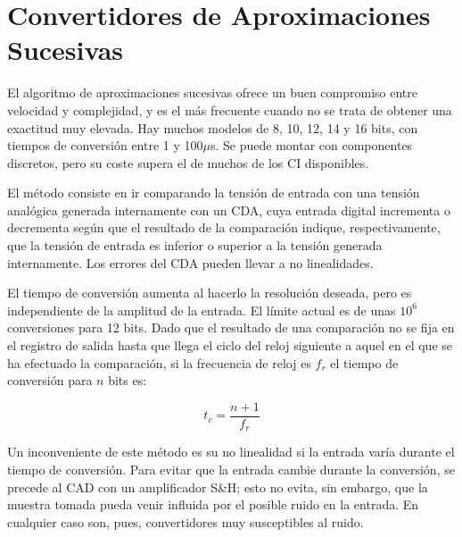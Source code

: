 \chapter{Convertidores de Aproximaciones Sucesivas}

El algoritmo de aproximaciones sucesivas ofrece un buen compromiso entre velocidad y complejidad, y es el más frecuente cuando no se trata de obtener una exactitud muy elevada. Hay muchos modelos de 8, 10, 12, 14 y 16 bits, con tiempos de conversión entre 1 y 100$\mu$s. Se puede montar con componentes discretos, pero su coste supera el de muchos de los CI disponibles.

El método consiste en ir comparando la tensión de entrada con una tensión analógica generada internamente con un CDA, cuya entrada digital incrementa o decrementa según que el resultado de la comparación indique, respectivamente, que la tensión de entrada es inferior o superior a la tensión generada internamente. Los errores del CDA pueden llevar a no linealidades.

El tiempo de conversión aumenta al hacerlo la resolución deseada, pero es independiente de la amplitud de la entrada. El límite actual es de unas $10^6$ conversiones para 12 bits. Dado que el resultado de una comparación no se fija en el registro de salida hasta que llega el ciclo del reloj siguiente a aquel en el que se ha efectuado la comparación, si la frecuencia de reloj es $f_r$ el tiempo de conversión para $n$ bits es:

\begin{equation}
    t_c = \frac{n + 1}{f_r}
\end{equation}

Un inconveniente de este método es su no linealidad si la entrada varía durante el tiempo de conversión. Para evitar que la entrada cambie durante la conversión, se precede al CAD con un amplificador S\&H; esto no evita, sin embargo, que la muestra tomada pueda venir influida por el posible ruido en la entrada. En cualquier caso son, pues, convertidores muy susceptibles al ruido.

